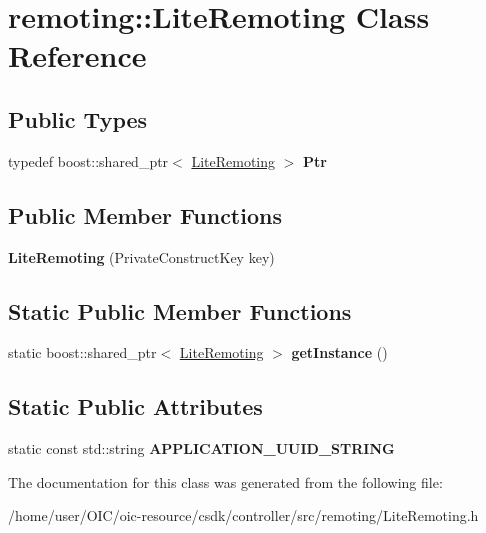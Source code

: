 \hypertarget{classremoting_1_1LiteRemoting}{}\section{remoting\+:\+:Lite\+Remoting Class Reference}
\label{classremoting_1_1LiteRemoting}
\subsection*{Public Types}
\begin{DoxyCompactItemize}
\item 
\hypertarget{classremoting_1_1LiteRemoting_acb133b1bca11b2788b3f40775a44ee39}{}typedef boost\+::shared\+\_\+ptr$<$ \hyperlink{classremoting_1_1LiteRemoting}{Lite\+Remoting} $>$ {\bfseries Ptr}\label{classremoting_1_1LiteRemoting_acb133b1bca11b2788b3f40775a44ee39}

\end{DoxyCompactItemize}
\subsection*{Public Member Functions}
\begin{DoxyCompactItemize}
\item 
\hypertarget{classremoting_1_1LiteRemoting_a02062ef11ead93d148bb509356e571c0}{}{\bfseries Lite\+Remoting} (Private\+Construct\+Key key)\label{classremoting_1_1LiteRemoting_a02062ef11ead93d148bb509356e571c0}

\end{DoxyCompactItemize}
\subsection*{Static Public Member Functions}
\begin{DoxyCompactItemize}
\item 
\hypertarget{classremoting_1_1LiteRemoting_a1f7a788b63d3a0839b692b4bbc1d9a7a}{}static boost\+::shared\+\_\+ptr$<$ \hyperlink{classremoting_1_1LiteRemoting}{Lite\+Remoting} $>$ {\bfseries get\+Instance} ()\label{classremoting_1_1LiteRemoting_a1f7a788b63d3a0839b692b4bbc1d9a7a}

\end{DoxyCompactItemize}
\subsection*{Static Public Attributes}
\begin{DoxyCompactItemize}
\item 
\hypertarget{classremoting_1_1LiteRemoting_a487c73741c3586a78acd0816558fe490}{}static const std\+::string {\bfseries A\+P\+P\+L\+I\+C\+A\+T\+I\+O\+N\+\_\+\+U\+U\+I\+D\+\_\+\+S\+T\+R\+I\+N\+G}\label{classremoting_1_1LiteRemoting_a487c73741c3586a78acd0816558fe490}

\end{DoxyCompactItemize}


The documentation for this class was generated from the following file\+:\begin{DoxyCompactItemize}
\item 
/home/user/\+O\+I\+C/oic-\/resource/csdk/controller/src/remoting/Lite\+Remoting.\+h\end{DoxyCompactItemize}
